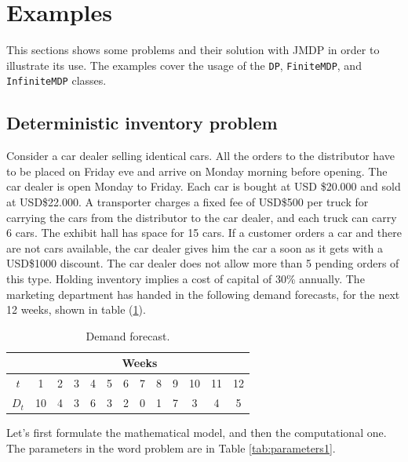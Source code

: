 \documentclass[11pt]{article}
\begin{document}
\section{Examples}

This sections shows some problems and their solution with JMDP in order to illustrate its use. The examples cover the usage of the \lstinline!DP!, \lstinline!FiniteMDP!, and \lstinline!InfiniteMDP! classes.

\subsection{Deterministic inventory problem}

Consider a car dealer selling identical cars. All the orders to the distributor have to be placed on Friday eve and arrive on Monday morning before opening. The car dealer is open Monday to Friday. Each car is bought at USD \$20.000 and sold at USD\$22.000. A transporter charges a fixed fee of USD\$500 per truck for carrying the cars from the distributor to the car dealer, and each truck can carry 6 cars. The exhibit hall has space for 15 cars. If a customer orders a car and there are not cars available, the car dealer gives him the car a soon as it gets with a USD\$1000 discount. The car dealer does not allow more than 5 pending orders of this type. Holding inventory implies a cost of capital of 30\% annually. The marketing department has handed in the following demand forecasts, for the next 12 weeks, shown in table (\ref{tab:demands}).

\begin{table}[htb]  \centering
\begin{tabular}{|c|c|c|c|c|c|c|c|c|c|c|c|c|}
\hline
\multicolumn{1}{|c|}{} & \multicolumn{12}{|c|}{Weeks}\\
\hline
$t$&1&2&3&4&5&6&7&8&9&10&11&12\\
\hline
$D_t$&10& 4& 3& 6& 3& 2& 0& 1& 7& 3& 4& 5  \\
\hline
\end{tabular}
\caption{Demand forecast.}\label{tab:demands}
\end{table}

Let's first formulate the mathematical model, and then the computational one. The parameters in the word problem are in Table \ref{tab:parameters1}.
\end{document}
